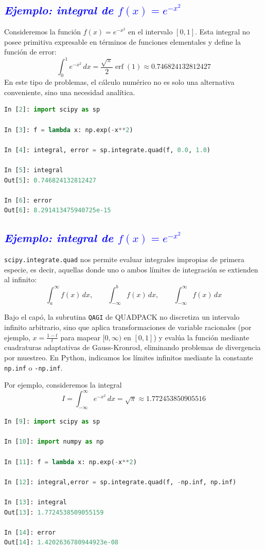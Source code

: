 \documentclass[12pt]{article}
\begin{document}
\subsection*{\textcolor{blue}{\textit{Ejemplo: integral de $f(x) = e^{-x^2}$}}}
Consideremos la función $f(x) = e^{-x^2}$ en el intervalo $[0, 1]$. Esta integral no 
posee primitiva expresable en términos de funciones 
elementales y define la función de error:
\[
\int_0^1 e^{-x^2}\,dx = \frac{\sqrt{\pi}}{2} \operatorname{erf}(1) \approx 0.746824132812427
\]
En este tipo de problemas, el cálculo numérico no es solo una alternativa conveniente, sino una necesidad analítica.

\begin{lstlisting}[language=Python]
In [2]: import scipy as sp

In [3]: f = lambda x: np.exp(-x**2)

In [4]: integral, error = sp.integrate.quad(f, 0.0, 1.0)

In [5]: integral
Out[5]: 0.746824132812427

In [6]: error
Out[6]: 8.291413475940725e-15
\end{lstlisting}


\subsection*{\textcolor{blue}{\textit{Ejemplo: integral de $f(x) = e^{-x^2}$}}}

\texttt{scipy.integrate.quad} nos permite evaluar integrales 
impropias de primera especie, es decir, aquellas donde uno o ambos 
límites de integración se extienden al infinito:
\[
\int_{a}^{\infty} f(x)\,dx, \qquad \int_{-\infty}^{b} f(x)\,dx, \qquad \int_{-\infty}^{\infty} f(x)\,dx
\]

Bajo el capó, la subrutina \texttt{QAGI} de QUADPACK no discretiza un 
intervalo infinito arbitrario, sino que aplica transformaciones de 
variable racionales (por ejemplo, $x = \frac{1 - t}{t}$ para 
mapear $[0, \infty)$ en $[0, 1]$) y evalúa la función mediante 
cuadraturas adaptativas de Gauss-Kronrod, eliminando problemas 
de divergencia por muestreo.
En Python, indicamos los límites infinitos mediante la constante 
\texttt{np.inf} o \texttt{-np.inf}.

Por ejemplo, consideremos la integral
\[
I = \int_{-\infty}^{\infty} e^{-x^2}\,dx = \sqrt{\pi} \approx 1.772453850905516
\]

\begin{lstlisting}[language=Python]
In [9]: import scipy as sp

In [10]: import numpy as np

In [11]: f = lambda x: np.exp(-x**2)

In [12]: integral,error = sp.integrate.quad(f, -np.inf, np.inf)

In [13]: integral
Out[13]: 1.7724538509055159

In [14]: error
Out[14]: 1.4202636780944923e-08
\end{lstlisting}
\end{document}
